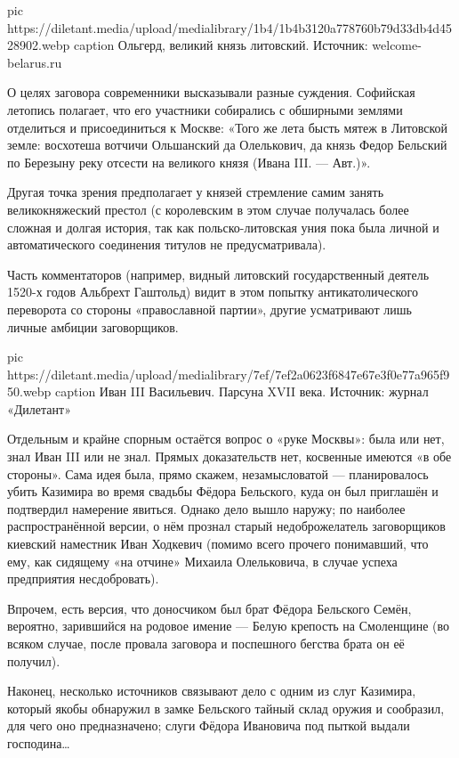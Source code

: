 \ifcmt
  pic https://diletant.media/upload/medialibrary/1b4/1b4b3120a778760b79d33db4d4528902.webp
  caption Ольгерд, великий князь литовский. Источник: welcome-belarus.ru
\fi

О целях заговора современники высказывали разные суждения. Софийская летопись
полагает, что его участники собирались с обширными землями отделиться и
присоединиться к Москве: «Того же лета бысть мятеж в Литовской земле: восхотеша
вотчичи Ольшанский да Олелькович, да князь Федор Бельский по Березыну реку
отсести на великого князя (Ивана III. — Авт.)».

Другая точка зрения предполагает у князей стремление самим занять
великокняжеский престол (с королевским в этом случае получалась более сложная и
долгая история, так как польско-литовская уния пока была личной и
автоматического соединения титулов не предусматривала).

Часть комментаторов (например, видный литовский государственный деятель 1520-х
годов Альбрехт Гаштольд) видит в этом попытку антикатолического переворота со
стороны «православной партии», другие усматривают лишь личные амбиции
заговорщиков. 

\ifcmt
  pic https://diletant.media/upload/medialibrary/7ef/7ef2a0623f6847e67e3f0e77a965f950.webp
  caption Иван III Васильевич. Парсуна XVII века. Источник: журнал «Дилетант»
\fi

Отдельным и крайне спорным остаётся вопрос о «руке Москвы»: была или нет, знал
Иван III или не знал. Прямых доказательств нет, косвенные имеются «в обе
стороны». Сама идея была, прямо скажем, незамысловатой — планировалось убить
Казимира во время свадьбы Фёдора Бельского, куда он был приглашён и подтвердил
намерение явиться. Однако дело вышло наружу; по наиболее распространённой
версии, о нём прознал старый недоброжелатель заговорщиков киевский наместник
Иван Ходкевич (помимо всего прочего понимавший, что ему, как сидящему «на
отчине» Михаила Олельковича, в случае успеха предприятия несдобровать).

Впрочем, есть версия, что доносчиком был брат Фёдора Бельского Семён, вероятно,
зарившийся на родовое имение — Белую крепость на Смоленщине (во всяком случае,
после провала заговора и поспешного бегства брата он её получил).

Наконец, несколько источников связывают дело с одним из слуг Казимира, который
якобы обнаружил в замке Бельского тайный склад оружия и сообразил, для чего оно
предназначено; слуги Фёдора Ивановича под пыткой выдали господина… 

